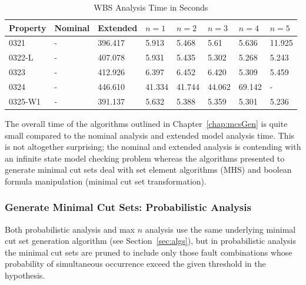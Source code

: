 \begin{center}
\begin{table}[htbp]
    \begin{tabular}{ | l | l | l | l | l | l | l | l |}
    \hline
    \textbf{Property} & Nominal & Extended & $n=1$ & $n=2$ & $n=3$ & $n=4$ & $n=5$     \\ \hline \hline
    0321 & - & 396.417 & 5.913 & 5.468 & 5.61 & 5.636 & 11.925  \\ \hline
    0322-L & - & 407.078 & 5.931 & 5.435 & 5.302 & 5.268 & 5.243 \\ \hline
    0323 & - & 412.926 & 6.397 & 6.452 & 6.420  & 5.309 & 5.459\\ \hline
    0324 & - & 446.610 & 41.334 & 41.744 & 44.062 & 69.142 & -\\ \hline
    0325-W1 & - & 391.137 & 5.632 & 5.388 &5.359 &5.301 & 5.236 \\ \hline
    \end{tabular}
    \caption{WBS Analysis Time in Seconds}
    \label{tab:wbs_mincut}
\end{table}
\end{center}

The overall time of the algorithms outlined in Chapter~\ref{chap:mcsGen} is quite small compared to the nominal analysis and extended model analysis time. This is not altogether surprising; the nominal and extended analysis is contending with an infinite state model checking problem whereas the algorithms presented to generate minimal cut sets deal with set element algorithms (MHS) and boolean formula manipulation (minimal cut set transformation). 

\subsubsection{Generate Minimal Cut Sets: Probabilistic Analysis}
\label{sec:prob_generate}
Both probabilistic analysis and max $n$ analysis use the same underlying minimal cut set generation algorithm (see Section~\ref{sec:algs}), but in probabilistic analysis the minimal cut sets are pruned to include only those fault combinations whose probability of simultaneous occurrence exceed the given threshold in the hypothesis. 


